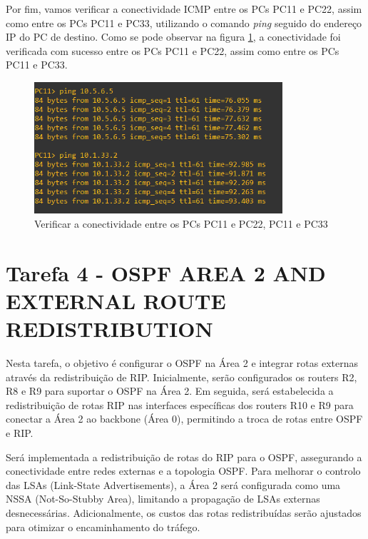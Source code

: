 \documentclass[11pt,english, openright, oneside]{book}
\begin{document}
\newpage
\par Por fim, vamos verificar a conectividade ICMP entre os PCs PC11 e PC22, assim como entre os PCs PC11 e PC33, utilizando o comando \textit{ping} seguido do endereço IP do PC de destino. Como se pode observar na figura \ref{fig:config29}, a conectividade foi verificada com sucesso entre os PCs PC11 e PC22, assim como entre os PCs PC11 e PC33.
\vspace{0.2cm}

\begin{figure}[H]
    \centering
    \includegraphics[width=0.82\textwidth]{imagens/Tarefa3/16.ping_PC11_PC22_PC33.png}
    \caption{Verificar a conectividade entre os PCs PC11 e PC22, PC11 e PC33}
    \label{fig:config29}
\end{figure} 
\pagebreak

\section{Tarefa 4 - OSPF AREA 2 AND EXTERNAL ROUTE REDISTRIBUTION}
\vspace{0.2cm}

Nesta tarefa, o objetivo é configurar o OSPF na Área 2 e integrar rotas externas através da redistribuição de RIP. Inicialmente, serão configurados os routers R2, R8 e R9 para suportar o OSPF na Área 2. Em seguida, será estabelecida a redistribuição de rotas RIP nas interfaces específicas dos routers R10 e R9 para conectar a Área 2 ao backbone (Área 0), permitindo a troca de rotas entre OSPF e RIP.

Será implementada a redistribuição de rotas do RIP para o OSPF, assegurando a conectividade entre redes externas e a topologia OSPF. Para melhorar o controlo das LSAs (Link-State Advertisements), a Área 2 será configurada como uma NSSA (Not-So-Stubby Area), limitando a propagação de LSAs externas desnecessárias. Adicionalmente, os custos das rotas redistribuídas serão ajustados para otimizar o encaminhamento do tráfego.
\end{document}
